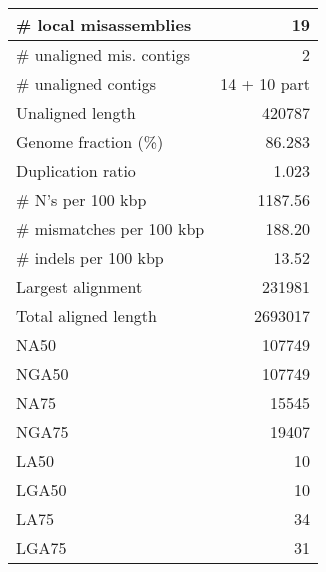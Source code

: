 \documentclass[12pt,a4paper]{article}
\begin{document}
\begin{table}[ht]
\begin{center}
\begin{tabular}{|l*{1}{|r}|}
\# local misassemblies & 19 \\ \hline
\# unaligned mis. contigs & 2 \\ \hline
\# unaligned contigs & 14 + 10 part \\ \hline
Unaligned length & 420787 \\ \hline
Genome fraction (\%) & 86.283 \\ \hline
Duplication ratio & 1.023 \\ \hline
\# N's per 100 kbp & 1187.56 \\ \hline
\# mismatches per 100 kbp & 188.20 \\ \hline
\# indels per 100 kbp & 13.52 \\ \hline
Largest alignment & 231981 \\ \hline
Total aligned length & 2693017 \\ \hline
NA50 & 107749 \\ \hline
NGA50 & 107749 \\ \hline
NA75 & 15545 \\ \hline
NGA75 & 19407 \\ \hline
LA50 & 10 \\ \hline
LGA50 & 10 \\ \hline
LA75 & 34 \\ \hline
LGA75 & 31 \\ \hline
\end{tabular}
\end{center}
\end{table}
\end{document}
